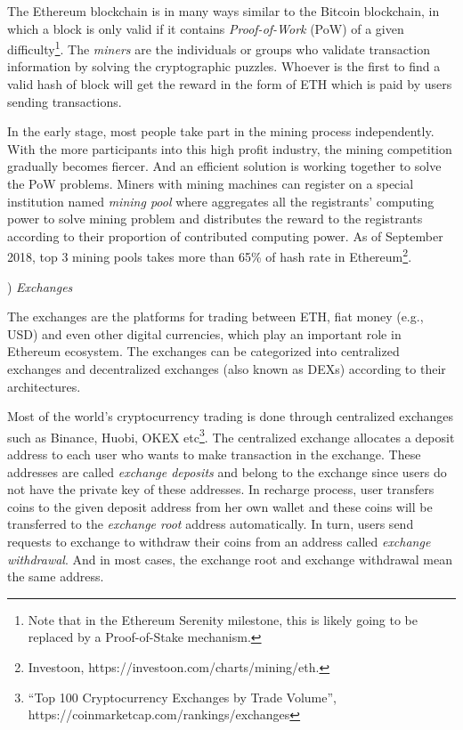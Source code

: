 The Ethereum blockchain is in many ways similar to the Bitcoin blockchain, in which a block is only valid if it contains \emph{Proof-of-Work} (PoW) of a given difficulty\footnote{Note that in the Ethereum Serenity milestone, this is likely going to be replaced by a Proof-of-Stake mechanism.}. The \emph{miners} are the individuals or groups who validate transaction information by solving the cryptographic puzzles. Whoever is the first to find a valid hash of block will get the reward in the form of ETH which is paid by users sending transactions.

In the early stage, most people take part in the mining process independently. With the more participants into this high profit industry, the mining competition gradually becomes fiercer. And an efficient solution is working together to solve the PoW problems. Miners with mining machines can register on a special institution named \emph{mining pool} where aggregates all the registrants' computing power to solve mining problem and distributes the reward to the registrants according to their proportion of contributed computing power. As of September 2018, top $3$ mining pools takes more than 65\% of hash rate in Ethereum\footnote{Investoon, https://investoon.com/charts/mining/eth.}.


) \emph{Exchanges}

The exchanges are the platforms for trading between ETH, fiat money (e.g., USD) and even other digital currencies, which play an important role in Ethereum ecosystem. The exchanges can be categorized into centralized exchanges and decentralized exchanges (also known as DEXs) according to their architectures.

Most of the world’s cryptocurrency trading is done through centralized exchanges such as Binance, Huobi, OKEX etc\footnote{``Top 100 Cryptocurrency Exchanges by Trade Volume'', https://coinmarketcap.com/rankings/exchanges}. The centralized exchange allocates a deposit address to each user who wants to make transaction in the exchange. These addresses are called \emph{exchange deposits} and belong to the exchange since users do not have the private key of these addresses. In recharge process, user transfers coins to the given deposit address from her own wallet and these coins will be transferred to the \emph{exchange root} address automatically. In turn, users send requests to exchange to withdraw their coins from an address called \emph{exchange withdrawal}. And in most cases, the exchange root and exchange withdrawal mean the same address.

